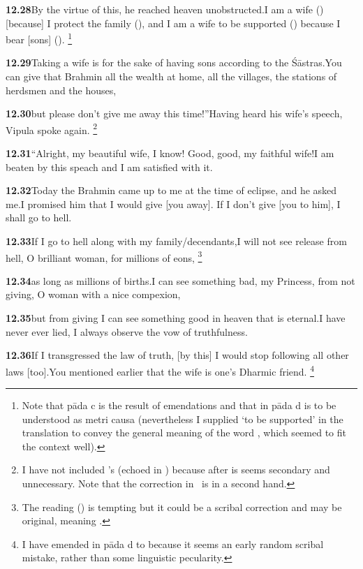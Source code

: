 \textbf{12.28}By the virtue of this, he reached heaven unobstructed.I am a wife () [because] I protect the family (), and I am a wife to                        be supported () because I bear [sons] ().%
\footnote{Note that pāda c is the result of emendations and that  in pāda d is                 to be understood as  metri causa (nevertheless I supplied `to be supported'                 in the translation to convey the general meaning of the word ,                  which seemed to fit the context well).  }%


\textbf{12.29}Taking a wife is for the sake of having sons according to the Śāstras.You can give that Brahmin all the wealth at home,                     all the villages, the stations of herdsmen and the houses,%


\textbf{12.30}but please don't give me away this time!''Having heard his wife's speech, Vipula spoke again.%
\footnote{I have not included \msCcpcorr's  (echoed in \Ed)                 because after  is seems secondary and unnecessary.                 Note that the correction in \msCc\ is in a second hand.  }%


\textbf{12.31}``Alright, my beautiful wife, I know! Good, good, my faithful wife!I am beaten by this speach and I am satisfied with it.%


\textbf{12.32}Today the Brahmin came up to me at the time of eclipse, and he asked me.I promised him that I would give [you away]. If I don't give [you to him], I shall go to hell.%


\textbf{12.33}If I go to hell along with my family/decendants,I will not see release from hell, O brilliant woman, for millions of eons,%
\footnote{The reading  (\msNc\Ed) is tempting but it could be a scribal correction and                  may be original, meaning .  }%


\textbf{12.34}as long as millions of births.I can see something bad, my Princess, from not giving, O woman with a nice compexion,%


\textbf{12.35}but from giving I can see something good in heaven that is eternal.I have never ever lied, I always observe the vow of truthfulness.%


\textbf{12.36}If I transgressed the law of truth, [by this]                                I would stop following all other laws [too].You mentioned earlier that the wife is one's Dharmic friend.%
\footnote{I have emended  in pāda d to  because it                  seems an early random scribal mistake, rather than some                  linguistic pecularity.  }%



